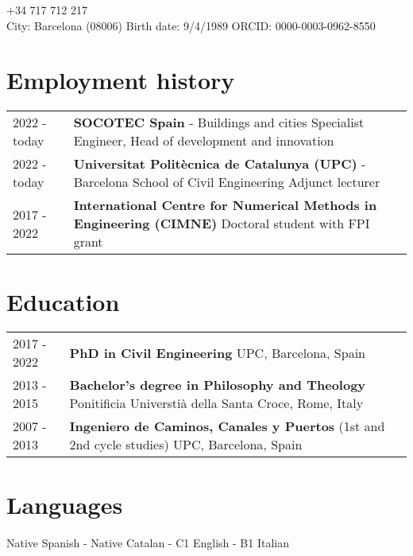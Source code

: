 \documentclass[12pt]{article}
\author{Miguel Masó, PhD}
\begin{document}
\maketitle
{} \qquad +34 717 712 217 \\
City: Barcelona (08006) \qquad
Birth date: 9/4/1989 \qquad
ORCID: 0000-0003-0962-8550


\section{Employment history}
\begin{tabularx}{\linewidth}{lX}
    2022 - today &
    \textbf{SOCOTEC Spain} - Buildings and cities \newline
    Specialist Engineer, Head of development and innovation \\

    2022 - today &
    \textbf{Universitat Politècnica de Catalunya (UPC)} - Barcelona School of Civil Engineering \newline
    Adjunct lecturer \\ 

    2017 - 2022 &
    \textbf{International Centre for Numerical Methods in Engineering (CIMNE)} \newline
    Doctoral student with FPI grant \\
\end{tabularx}


\section{Education}
\begin{tabularx}{\linewidth}{lX}
    2017 - 2022 &
    \textbf{PhD in Civil Engineering} \newline
    UPC, Barcelona, Spain \\

    2013 - 2015 &
    \textbf{Bachelor's degree in Philosophy and Theology} \newline
    Ponitificia Universtià della Santa Croce, Rome, Italy \\

    2007 - 2013 &
    \textbf{Ingeniero de Caminos, Canales y Puertos} (1st and 2nd cycle studies) \newline
    UPC, Barcelona, Spain \\
\end{tabularx}


\section{Languages}
Native Spanish - Native Catalan - C1 English - B1 Italian
\end{document}
